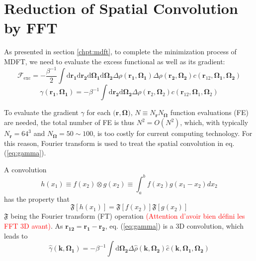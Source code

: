 
\chapter{Reduction of Spatial Convolution by FFT\label{chpt:fft-spatial}}

As presented in section \ref{chpt:mdft}, to complete the minimization
process of MDFT, we need to evaluate the excess functional as well
as its gradient:
\begin{equation}
\mathcal{F}_{\mathrm{exc}}=-\frac{\beta^{-1}}{2}\int\mathrm{d}\mathbf{r_{1}}\mathrm{d}\mathbf{r_{2}}\mathrm{d}\mathbf{\Omega_{1}}\mathrm{d}\mathbf{\Omega_{2}}\Delta\rho(\mathbf{r_{1}},\mathbf{\Omega_{1}})\Delta\rho(\mathbf{r_{2}},\mathbf{\Omega_{2}})c(\mathbf{r}_{12},\mathbf{\Omega_{1}},\mathbf{\Omega_{2}})\label{eq:fexc}
\end{equation}
\begin{equation}
\gamma(\mathbf{r_{1}},\mathbf{\Omega_{1}})=-\beta^{-1}\int\mathrm{d}\mathbf{r_{2}}\mathrm{d}\mathbf{\Omega_{2}}\Delta\rho(\mathbf{r}_{2},\mathbf{\Omega}_{2})c(\mathbf{r}_{12},\mathbf{\Omega}_{1},\mathbf{\Omega}_{2})\label{eq:gamma}
\end{equation}


To evaluate the gradient $\gamma$ for each $\mathbf{(r},\mathbf{\Omega})$,
$N\equiv N_{\mathbf{r}}N_{\mathbf{\Omega}}$ function evaluations
(FE) are needed, the total number of FE is thus $N^{2}=O(N^{2})$,
which, with typically $N_{\mathbf{r}}=64^{3}$ and $N_{\mathbf{\Omega}}=50\sim100$,
is too costly for current computing technology. For this reason, Fourier
transform is used to treat the spatial convolution in eq. (\ref{eq:gamma}).

A convolution
\begin{equation}
h(x_{1})\equiv f(x_{2})\otimes g(x_{2})\equiv\int_{a}^{b}f(x_{2})g(x_{1}-x_{2})dx_{2}\label{eq:convolution-1}
\end{equation}
has the property that
\begin{equation}
\mathfrak{F}[h(x_{1})]=\mathfrak{F}[f(x_{2})]\mathfrak{F}[g(x_{2})]\label{eq:convolution-2}
\end{equation}
$\mathfrak{F}$ being the Fourier transform (FT) operation \textcolor{red}{(Attention
d'avoir bien défini les FFT 3D avant)}. As $\mathbf{r_{12}}=\mathbf{r_{1}}-\mathbf{r_{2}}$,
eq. (\ref{eq:gamma}) is a 3D convolution, which leads to 
\begin{equation}
\hat{\gamma}(\mathbf{k},\mathbf{\Omega_{1}})=-\beta^{-1}\int\mathrm{d}\mathbf{\Omega_{2}}\Delta\hat{\rho}(\mathbf{k},\mathbf{\Omega_{2}})\hat{c}(\mathbf{k},\mathbf{\Omega_{1}},\mathbf{\Omega_{2}})\label{eq:gamma-k}
\end{equation}


